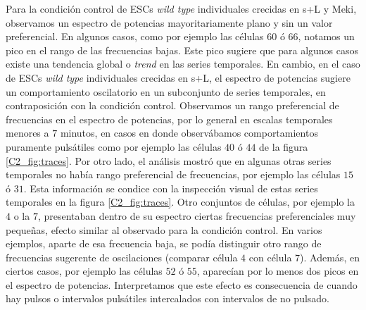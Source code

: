 \documentclass[./main.tex]{subfiles}
\begin{document}
Para la condición control de ESCs \textit{wild type} individuales crecidas en s+L y Meki, observamos un espectro de potencias mayoritariamente plano y sin un valor preferencial. En algunos casos, como por ejemplo las células $60$ ó $66$, notamos un pico en el rango de las frecuencias bajas. Este pico sugiere que para algunos casos existe una tendencia global o \textit{trend} en las series temporales. En cambio, en el caso de ESCs \textit{wild type} individuales crecidas en s+L, el espectro de potencias sugiere un comportamiento oscilatorio en un subconjunto de series temporales, en contraposición con la condición control. Observamos un rango preferencial de frecuencias en el espectro de potencias, por lo general en escalas temporales menores a $7$ minutos, en casos en donde observábamos comportamientos puramente pulsátiles como por ejemplo las células $40$ ó $44$ de la figura \ref{C2_fig:traces}. Por otro lado, el análisis mostró que en algunas otras series temporales no había rango preferencial de frecuencias, por ejemplo las células $15$ ó $31$. Esta información se condice con la inspección visual de estas series temporales en la figura \ref{C2_fig:traces}. Otro conjuntos de células, por ejemplo la $4$ o la $7$, presentaban dentro de su espectro ciertas frecuencias preferenciales muy pequeñas, efecto similar al observado para la condición control. En varios ejemplos, aparte de esa frecuencia baja, se podía distinguir otro rango de frecuencias sugerente de oscilaciones (comparar célula $4$ con célula $7$). Además, en ciertos casos, por ejemplo las células $52$ ó $55$, aparecían por lo menos dos picos en el espectro de potencias. Interpretamos que este efecto es consecuencia de cuando hay pulsos o intervalos pulsátiles intercalados con intervalos de no pulsado. 
\end{document}
